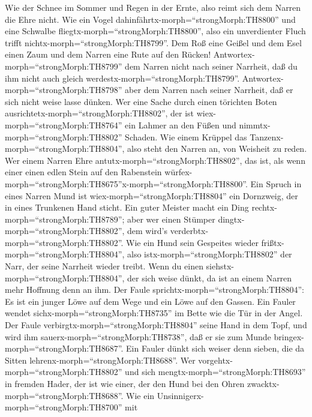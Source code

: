  Wie der Schnee im Sommer und Regen in der Ernte, also reimt
sich dem Narren die Ehre nicht.  Wie ein Vogel
dahinfährtx-morph=``strongMorph:TH8800'' und eine Schwalbe
fliegtx-morph=``strongMorph:TH8800'', also ein unverdienter Fluch trifft
nichtx-morph=``strongMorph:TH8799''.  Dem Roß eine Geißel
und dem Esel einen Zaum und dem Narren eine Rute auf den Rücken!
 Antwortex-morph=``strongMorph:TH8799'' dem Narren nicht
nach seiner Narrheit, daß du ihm nicht auch gleich
werdestx-morph=``strongMorph:TH8799''. 
Antwortex-morph=``strongMorph:TH8798'' aber dem Narren nach seiner
Narrheit, daß er sich nicht weise lasse dünken.  Wer eine
Sache durch einen törichten Boten
ausrichtetx-morph=``strongMorph:TH8802'', der ist
wiex-morph=``strongMorph:TH8764'' ein Lahmer an den Füßen und
nimmtx-morph=``strongMorph:TH8802'' Schaden.  Wie einem
Krüppel das Tanzenx-morph=``strongMorph:TH8804'', also steht den Narren
an, von Weisheit zu reden.  Wer einem Narren Ehre
antutx-morph=``strongMorph:TH8802'', das ist, als wenn einer einen edlen
Stein auf den Rabenstein
würfex-morph=``strongMorph:TH8675''x-morph=``strongMorph:TH8800''.
 Ein Spruch in eines Narren Mund ist
wiex-morph=``strongMorph:TH8804'' ein Dornzweig, der in eines Trunkenen
Hand sticht.  Ein guter Meister macht ein Ding
rechtx-morph=``strongMorph:TH8789''; aber wer einen Stümper
dingtx-morph=``strongMorph:TH8802'', dem wird's
verderbtx-morph=``strongMorph:TH8802''.  Wie ein Hund sein
Gespeites wieder frißtx-morph=``strongMorph:TH8804'', also
istx-morph=``strongMorph:TH8802'' der Narr, der seine Narrheit wieder
treibt.  Wenn du einen
siehstx-morph=``strongMorph:TH8804'', der sich weise dünkt, da ist an
einem Narren mehr Hoffnung denn an ihm.  Der Faule
sprichtx-morph=``strongMorph:TH8804'': Es ist ein junger Löwe auf dem
Wege und ein Löwe auf den Gassen.  Ein Fauler wendet
sichx-morph=``strongMorph:TH8735'' im Bette wie die Tür in der Angel.
 Der Faule verbirgtx-morph=``strongMorph:TH8804'' seine
Hand in dem Topf, und wird ihm sauerx-morph=``strongMorph:TH8738'', daß
er sie zum Munde bringex-morph=``strongMorph:TH8687''.  Ein
Fauler dünkt sich weiser denn sieben, die da Sitten
lehrenx-morph=``strongMorph:TH8688''.  Wer
vorgehtx-morph=``strongMorph:TH8802'' und sich
mengtx-morph=``strongMorph:TH8693'' in fremden Hader, der ist wie einer,
der den Hund bei den Ohren zwacktx-morph=``strongMorph:TH8688''.
 Wie ein Unsinnigerx-morph=``strongMorph:TH8700'' mit
